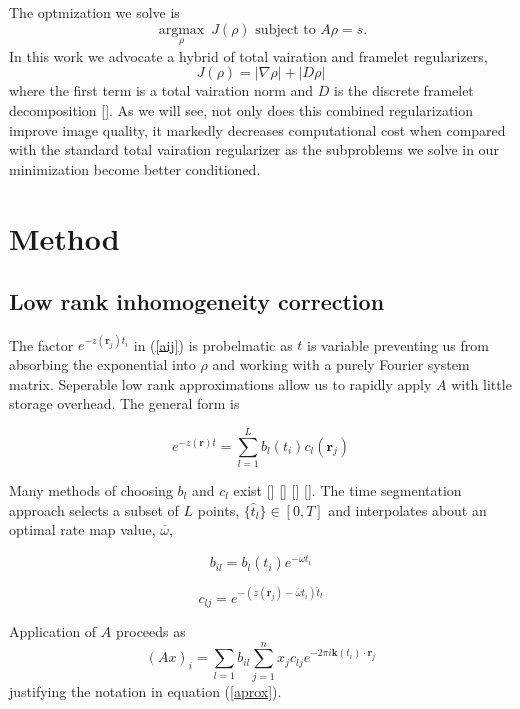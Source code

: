 \documentclass[11pt]{amsart}
\theoremstyle{remark}
\begin{document}
The optmization we solve is
\begin{equation}\label{gcsequ}
\underset{\rho}{\operatorname{argmax}} \: J(\rho)  \text{ subject to } A \rho = s.
\end{equation}
In this work we advocate a hybrid of total vairation and framelet regularizers,
\begin{equation}
J(\rho) = | \nabla \rho| + | D \rho |
\end{equation}
where the first term is a total vairation norm and $D$ is the discrete framelet decomposition []. As we will see, not only does this combined regularization improve image quality, it markedly decreases computational cost when compared with the standard total vairation regularizer as the subproblems we solve in our minimization become better conditioned.

\section{Method}

\subsection{Low rank inhomogeneity correction}
The factor $e^{-z(\mathbf{r}_j)t_i}$ in (\ref{aij}) is probelmatic as $t$ is variable preventing us from absorbing the exponential into $\rho$ and working with a purely Fourier system matrix. Seperable low rank approximations allow us to rapidly apply $A$ with little storage overhead. The general form is 

\begin{equation}
e^{-z(\mathbf{r})t} = \sum_{l=1}^L b_{l}(t_i)c_{l}(\mathbf{r}_j)
\end{equation}

Many methods of choosing $b_l$ and $c_l$ exist [] [] [] []. The time segmentation approach \cite{Sutton2003} selects a subset of $L$ points, $\{ \hat{t}_l \} \in [0,T]$ and interpolates about an optimal rate map value, $\overline{\omega}$,

\begin{equation}
b_{il} = b_l(t_i)e^{-\overline{\omega}t_i}
\end{equation}

\begin{equation}
c_{lj} = e^{-(z(\mathbf{r}_j) - \overline{\omega}t_i)\hat{t}_l}
\end{equation}

Application of $A$ proceeds as
\begin{equation}
(Ax)_i = \sum_{l=1} b_{il} \sum_{j=1}^n x_j c_{lj} e^{-2\pi i \mathbf{k}(t_i) \cdot \mathbf{r}_j}
\end{equation}
justifying the notation in equation (\ref{aprox}).
\end{document}
